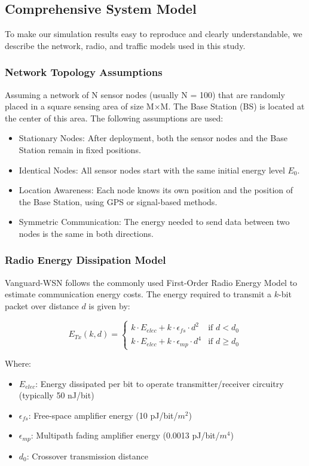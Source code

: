 \documentclass[conference]{IEEEtran}
\begin{document}
\subsection{Comprehensive System Model}
To make our simulation results easy to reproduce and clearly understandable, we describe the network, radio, and traffic models used in this study.

\subsubsection{Network Topology Assumptions}
Assuming a network of N sensor nodes (usually N = 100) that are randomly placed in a square sensing area of size M$\times$M. The Base Station (BS) is located at the center of this area.
The following assumptions are used:
\begin{itemize}
    \item Stationary Nodes: After deployment, both the sensor nodes and the Base Station remain in fixed positions.
    \item Identical Nodes: All sensor nodes start with the same initial energy level $E_0$.
    \item Location Awareness: Each node knows its own position and the position of the Base Station, using GPS or signal-based methods.
    \item Symmetric Communication: The energy needed to send data between two nodes is the same in both directions.
\end{itemize}

\subsubsection{Radio Energy Dissipation Model}
Vanguard-WSN follows the commonly used First-Order Radio Energy Model to estimate communication energy costs. The energy required to transmit a $k$-bit packet over distance $d$ is given by:

\begin{equation}
E_{Tx}(k, d) = \begin{cases} 
k \cdot E_{elec} + k \cdot \epsilon_{fs} \cdot d^2 & \text{if } d < d_0 \\
k \cdot E_{elec} + k \cdot \epsilon_{mp} \cdot d^4 & \text{if } d \ge d_0 
\end{cases}
\end{equation}

Where:
\begin{itemize}
    \item $E_{elec}$: Energy dissipated per bit to operate transmitter/receiver circuitry (typically 50 nJ/bit)
    \item $\epsilon_{fs}$: Free-space amplifier energy (10 pJ/bit/$m^2$)
    \item $\epsilon_{mp}$: Multipath fading amplifier energy (0.0013 pJ/bit/$m^4$)
    \item $d_0$: Crossover transmission distance 
\end{itemize}
\end{document}
